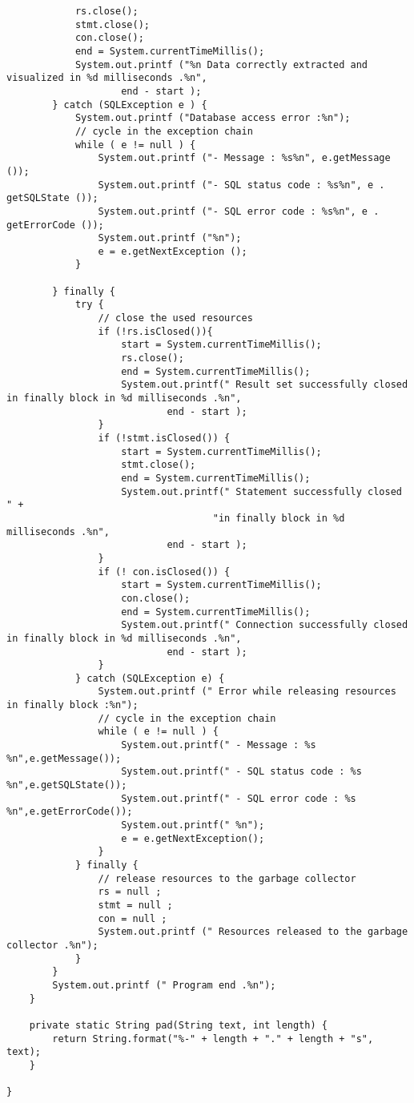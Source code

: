 \begin{lstlisting}
            rs.close();
            stmt.close();
            con.close();
            end = System.currentTimeMillis();
            System.out.printf ("%n Data correctly extracted and visualized in %d milliseconds .%n",
                    end - start );
        } catch (SQLException e ) {
            System.out.printf ("Database access error :%n");
            // cycle in the exception chain
            while ( e != null ) {
                System.out.printf ("- Message : %s%n", e.getMessage ());
                System.out.printf ("- SQL status code : %s%n", e . getSQLState ());
                System.out.printf ("- SQL error code : %s%n", e . getErrorCode ());
                System.out.printf ("%n");
                e = e.getNextException ();
            }

        } finally {
            try {
                // close the used resources
                if (!rs.isClosed()){
                    start = System.currentTimeMillis();
                    rs.close();
                    end = System.currentTimeMillis();
                    System.out.printf(" Result set successfully closed in finally block in %d milliseconds .%n",
                            end - start );
                }
                if (!stmt.isClosed()) {
                    start = System.currentTimeMillis();
                    stmt.close();
                    end = System.currentTimeMillis();
                    System.out.printf(" Statement successfully closed " +
                                    "in finally block in %d milliseconds .%n",
                            end - start );
                }
                if (! con.isClosed()) {
                    start = System.currentTimeMillis();
                    con.close();
                    end = System.currentTimeMillis();
                    System.out.printf(" Connection successfully closed in finally block in %d milliseconds .%n",
                            end - start );
                }
            } catch (SQLException e) {
                System.out.printf (" Error while releasing resources in finally block :%n");
                // cycle in the exception chain
                while ( e != null ) {
                    System.out.printf(" - Message : %s %n",e.getMessage());
                    System.out.printf(" - SQL status code : %s %n",e.getSQLState());
                    System.out.printf(" - SQL error code : %s %n",e.getErrorCode());
                    System.out.printf(" %n");
                    e = e.getNextException();
                }
            } finally {
                // release resources to the garbage collector
                rs = null ;
                stmt = null ;
                con = null ;
                System.out.printf (" Resources released to the garbage collector .%n");
            }
        }
        System.out.printf (" Program end .%n");
    }

    private static String pad(String text, int length) {
        return String.format("%-" + length + "." + length + "s", text);
    }

}




\end{lstlisting}
